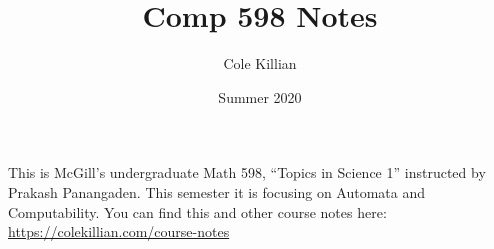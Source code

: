 \documentclass{scrartcl}
\title{Comp 598 Notes}
\author{Cole Killian}
\date{Summer 2020}
\begin{document}
\maketitle

This is McGill’s undergraduate Math 598, ``Topics in Science 1'' instructed by
Prakash Panangaden. This semester it is focusing on Automata and Computability.
You can find this and other course notes here:
\href{https://colekillian.com/course-notes}{https://colekillian.com/course-notes}

\tableofcontents
\newpage
















\end{document}
